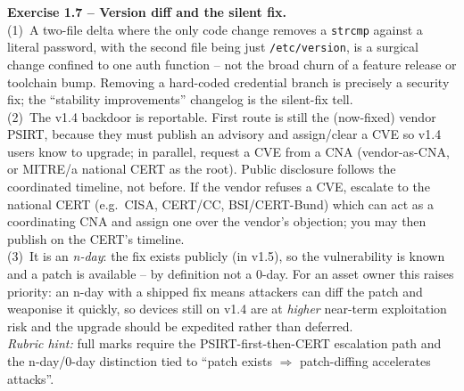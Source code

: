 \documentclass[11pt,a4paper]{article}
\begin{document}
\begin{solutionbox}
\textbf{Exercise 1.7 -- Version diff and the silent fix.}\\[2pt]
(1)~A two-file delta where the only code change removes a \texttt{strcmp} against a literal
password, with the second file being just \texttt{/etc/version}, is a surgical change confined to
one auth function -- not the broad churn of a feature release or toolchain bump. Removing a
hard-coded credential branch is precisely a security fix; the ``stability improvements''
changelog is the silent-fix tell.\\[2pt]
(2)~The v1.4 backdoor is reportable. First route is still the (now-fixed) vendor PSIRT, because
they must publish an advisory and assign/clear a CVE so v1.4 users know to upgrade; in parallel,
request a CVE from a CNA (vendor-as-CNA, or MITRE/a national CERT as the root). Public disclosure
follows the coordinated timeline, not before. If the vendor refuses a CVE, escalate to the
national CERT (e.g.\ CISA, CERT/CC, BSI/CERT-Bund) which can act as a coordinating CNA and assign
one over the vendor's objection; you may then publish on the CERT's timeline.\\[2pt]
(3)~It is an \emph{n-day}: the fix exists publicly (in v1.5), so the vulnerability is known and a
patch is available -- by definition not a 0-day. For an asset owner this raises priority: an
n-day with a shipped fix means attackers can diff the patch and weaponise it quickly, so devices
still on v1.4 are at \emph{higher} near-term exploitation risk and the upgrade should be expedited
rather than deferred.\\[2pt]
\emph{Rubric hint:} full marks require the PSIRT-first-then-CERT escalation path and the
n-day/0-day distinction tied to ``patch exists $\Rightarrow$ patch-diffing accelerates attacks''.
\end{solutionbox}
\end{document}
